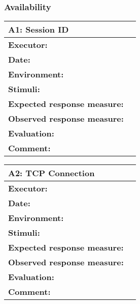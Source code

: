 \subsubsection{Availability}

\begin{tabular}{|m{}||m{}|}
\hline
\multicolumn{2}{|l|}{A1: Session ID} \\ \hline
\textbf{Executor:} & \\ \hline
\textbf{Date:} & \\ \hline
\textbf{Environment:} & \\ \hline
\textbf{Stimuli:} & \\ \hline
\textbf{Expected response measure:} & \\ \hline
\textbf{Observed response measure:} & \\ \hline
\textbf{Evaluation:} & \\ \hline
\textbf{Comment:} & \\ \hline
\end{tabular}

\begin{tabular}{|m{}||m{}|}
\hline
\multicolumn{2}{|l|}{A2: TCP Connection} \\ \hline
\textbf{Executor:} & \\ \hline
\textbf{Date:} & \\ \hline
\textbf{Environment:} & \\ \hline
\textbf{Stimuli:} & \\ \hline
\textbf{Expected response measure:} & \\ \hline
\textbf{Observed response measure:} & \\ \hline
\textbf{Evaluation:} & \\ \hline
\textbf{Comment:} & \\ \hline
\end{tabular}
